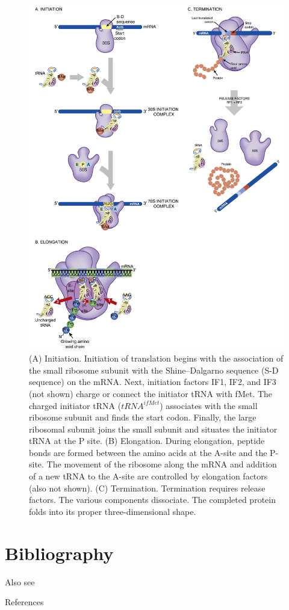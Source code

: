 \documentclass[11pt,ignorenonframetext,aspectratio=169]{beamer}
\begin{document}
\begin{frame}{}
\protect\hypertarget{section-23}{}

\begin{figure}
\includegraphics[width=0.35\linewidth]{../images/translation_prokaryotes} \caption{(A) Initiation. Initiation of translation begins with the association of the small ribosome subunit with the Shine–Dalgarno sequence (S-D sequence) on the mRNA. Next, initiation factors IF1, IF2, and IF3 (not shown) charge or connect the initiator tRNA with fMet. The charged initiator tRNA ($tRNA^{ifMet}$) associates with the small ribosome subunit and finds the start codon. Finally, the large ribosomal subunit joins the small subunit and situates the initiator tRNA at the P site. (B) Elongation. During elongation, peptide bonds are formed between the amino acids at the A-site and the P-site. The movement of the ribosome along the mRNA and addition of a new tRNA to the A-site are controlled by elongation factors (also not shown). (C) Termination. Termination requires release factors. The various components dissociate. The completed protein folds into its proper three-dimensional shape.}\label{fig:translation-prokaryotes}
\end{figure}

\end{frame}

\hypertarget{bibliography}{%
\section{Bibliography}\label{bibliography}}

\begin{frame}{Also see}
\protect\hypertarget{also-see}{}

\end{frame}

\begin{frame}{References}
\protect\hypertarget{references}{}

\end{frame}
\end{document}
